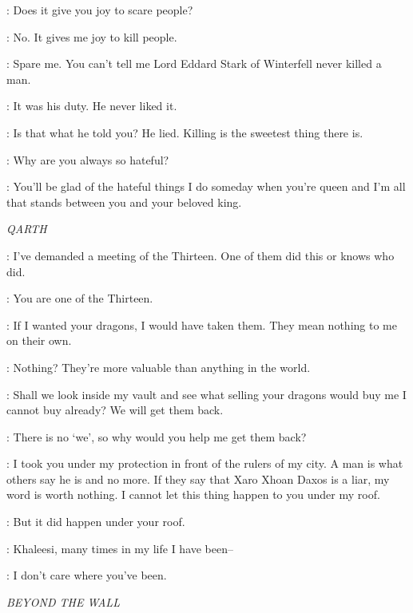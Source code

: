 \SANSA: Does it give you joy to scare people?

\HOUND: No. It gives me joy to kill people.


\HOUND: Spare me. You can't tell me Lord Eddard Stark of Winterfell never killed a man.

\SANSA: It was his duty. He never liked it.

\HOUND: Is that what he told you? He lied. Killing is the sweetest thing there is.

\SANSA: Why are you always so hateful?

\HOUND: You'll be glad of the hateful things I do someday when you're queen and I'm all that stands between you and your beloved king.



\scene

\textit{QARTH}


\XARO: I've demanded a meeting of the Thirteen. One of them did this or knows who did.

\DAENERYS: You are one of the Thirteen.

\XARO: If I wanted your dragons, I would have taken them. They mean nothing to me on their own.

\DAENERYS: Nothing? They're more valuable than anything in the world.

\XARO: Shall we look inside my vault and see what selling your dragons would buy me I cannot buy already? We will get them back.

\DAENERYS: There is no `we', so why would you help me get them back?

\XARO: I took you under my protection in front of the rulers of my city. A man is what others say he is and no more. If they say that Xaro Xhoan Daxos is a liar, my word is worth nothing. I cannot let this thing happen to you under my roof.

\DAENERYS: But it did happen under your roof.

\XARO: Khaleesi, many times in my life I have been--

\DAENERYS: I don't care where you've been.


\scene

\textit{BEYOND THE WALL}

